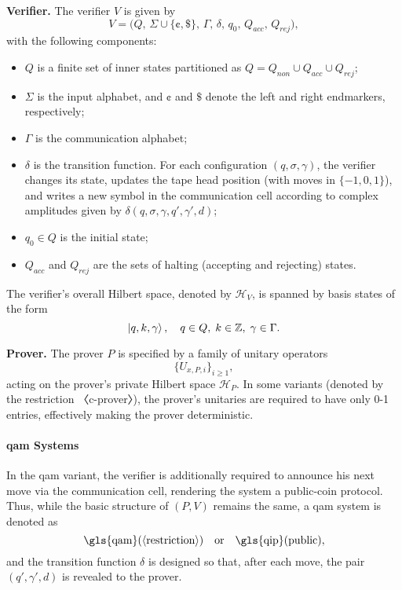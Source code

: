 \textbf{Verifier.} The verifier $V$ is given by
\[
V = \bigl(Q,\, \Sigma \cup \{\cent,\$\},\, \Gamma,\, \delta,\, q_0,\, Q_{acc},\, Q_{rej}\bigr),
\]
with the following components:
\begin{itemize}
  \item $Q$ is a finite set of inner states partitioned as $Q = Q_{non} \cup Q_{acc} \cup Q_{rej}$;
  \item $\Sigma$ is the input alphabet, and $\cent$ and $\$$ denote the left and right endmarkers, respectively;
  \item $\Gamma$ is the communication alphabet;
  \item $\delta$ is the transition function. For each configuration $(q,\sigma,\gamma)$, the verifier changes its state, updates the tape head position (with moves in $\{-1,0,1\}$), and writes a new symbol in the communication cell according to complex amplitudes given by $\delta(q,\sigma,\gamma,q',\gamma',d)$;
  \item $q_0\in Q$ is the initial state;
  \item $Q_{acc}$ and $Q_{rej}$ are the sets of halting (accepting and rejecting) states.
\end{itemize}
The verifier's overall Hilbert space, denoted by $\mathit{\mathcal{H}}_V$, is spanned by basis states of the form
\[
\ket{q, k, \gamma},\quad q\in Q,\; k\in \mathbb{Z},\; \gamma\in\Gamma.
\]

\textbf{Prover.} The prover $P$ is specified by a family of unitary operators
\[
\{U_{x,P,i}\}_{i\ge1},
\]
acting on the prover's private Hilbert space $\mathit{\mathcal{H}}_P$. In some variants (denoted by the restriction 〈c-prover〉), the prover's unitaries are required to have only 0-1 entries, effectively making the prover deterministic.

\paragraph{\gls{qam} Systems} In the \gls{qam} variant, the verifier is additionally required to announce his next move via the communication cell, rendering the system a public-coin protocol. Thus, while the basic structure of $(P,V)$ remains the same, a \gls{qam} system is denoted as
\[
\text{\gls{qam}}(\langle\text{restriction}\rangle) \quad \text{or} \quad \text{\gls{qip}}(\text{public}),
\]
and the transition function $\delta$ is designed so that, after each move, the pair $(q',\gamma',d)$ is revealed to the prover.


